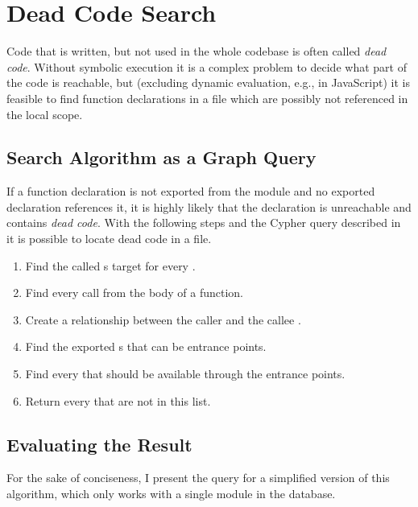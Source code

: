 \section{Dead Code Search}
\label{sect:dead-code-search}
Code that is written, but not used in the whole codebase is often called \emph{dead code}. Without symbolic execution it is a complex problem to decide what part of the code is reachable, but (excluding dynamic evaluation, e.g.,  in JavaScript) it is feasible to find function declarations in a file which are possibly not referenced in the local scope.

\subsection{Search Algorithm as a Graph Query}
If a function declaration is not exported from the module and no exported declaration references it, it is highly likely that the declaration is unreachable and contains \emph{dead code}. With the following steps and the Cypher query described in~ it is possible to locate dead code in a file.

\begin{enumerate}
	\item Find the called s target for every .
	\item Find every call from the body of a function.
	\item Create a  relationship between the caller and the callee .
	\item Find the exported s that can be entrance points.
	\item Find every  that should be available through the entrance points.
	\item Return every  that are not in this list.
\end{enumerate}

\begin{figure}[!htb]
	\begin{minipage}{\textwidth}
		
	\end{minipage}
\end{figure}

\subsection{Evaluating the Result}
For the sake of conciseness, I present the query for a simplified version of this algorithm, which only works with a single module in the database.

